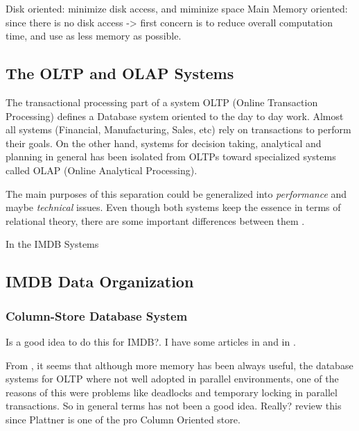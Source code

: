 \documentclass[10pt]{article} %
\begin{document}
Disk oriented: minimize disk access, and miminize space
Main Memory oriented: since there is no disk access -> first concern is to reduce overall computation time, and use as less memory as possible.



\subsection{The OLTP and OLAP Systems}
The transactional processing part of a system OLTP (Online Transaction Processing) defines a Database system oriented to the day to day work. Almost all systems (Financial, Manufacturing, Sales, etc) rely on transactions to perform their goals. On the other hand, systems for decision taking, analytical and planning in general has been isolated from OLTPs toward specialized systems called OLAP (Online Analytical Processing).

The main purposes of this separation could be generalized into \emph{ performance } and maybe \emph{technical} issues. Even though both systems keep the essence in terms of relational theory, there are some important differences between them \cite{Plattner}.

In the IMDB Systems 

\subsection{IMDB Data Organization}
\subsubsection{Column-Store Database System}
Is a good idea to do this for IMDB?. I have some articles in \cite{ColumnOriented} and in \cite{ColumnOriented1}.

From \cite{Plattner}, it seems that although more memory has been always useful, the database systems for OLTP where not well adopted in parallel environments, one of the reasons of this were problems like deadlocks and temporary locking in parallel transactions. So in general terms has not been a good idea. Really? review this since Plattner is one of the pro Column Oriented store.
\end{document}
